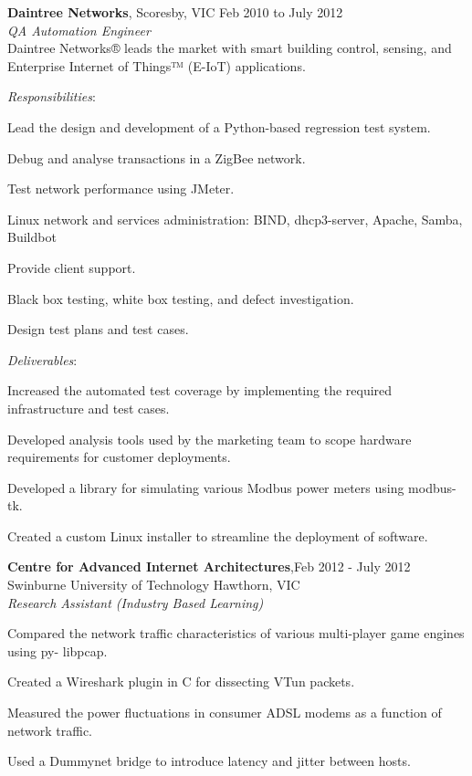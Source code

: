 \documentclass[line,margin]{res}
\begin{document}
\begin{resume}
        \textbf{Daintree Networks}, Scoresby, VIC \hfill Feb 2010 to July 2012 \\
        \textit{QA Automation Engineer}\\
        Daintree Networks® leads the market with smart building control, sensing, and Enterprise Internet of Things™ (E-IoT) applications.

        \textit{Responsibilities}:
        \begin{list}{}{\leftmargin=1em \itemsep=-2pt}
            \item{Lead the design and development of a Python-based regression test system.}
            \item{Debug and analyse transactions in a ZigBee network.}
            \item{Test network performance using JMeter.}
            \item{Linux network and services administration: BIND, dhcp3-server, Apache, Samba, Buildbot}
            \item{Provide client support.}
            \item{Black box testing, white box testing, and defect investigation.}
            \item{Design test plans and test cases.}
        \end{list}
             
        \textit{Deliverables}:
        \begin{list}{}{\leftmargin=1em \itemsep=-2pt}
            \item{Increased the automated test coverage by implementing the required infrastructure and test cases.}
            \item{Developed analysis tools used by the marketing team to scope hardware requirements for customer deployments.}
            \item{Developed a library for simulating various Modbus power meters using modbus-tk.}
            \item{Created a custom Linux installer to streamline the deployment of software.}
        \end{list}

        \textbf{Centre for Advanced Internet Architectures},\hfill Feb 2012 - July 2012 \\
        Swinburne University of Technology Hawthorn, VIC \\
        \textit{Research Assistant (Industry Based Learning)}
        \begin{list}{}{\leftmargin=1em \itemsep=-2pt}
            \item{Compared the network traffic characteristics of various multi-player game engines using py-
                libpcap.}
            \item{Created a Wireshark plugin in C for dissecting VTun packets.}
            \item{Measured the power fluctuations in consumer ADSL modems as a function of network traffic.}
            \item{Used a Dummynet bridge to introduce latency and jitter between hosts.}
        \end{list}


\end{resume}
\end{document}
